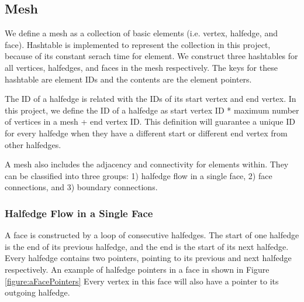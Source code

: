 \documentclass[12pt]{article}
\begin{document}
\subsection{Mesh}
We define a mesh as a collection of basic elements (i.e. vertex, halfedge, and face). Hashtable is implemented to represent the collection in this project, because of its constant serach time for element. We construct three hashtables for all vertices, halfedges, and faces in the mesh respectively. The keys for these hashtable are element IDs and the contents are the element pointers.

The ID of a halfedge is related with the IDs of its start vertex and end vertex. In this project, we define the ID of a halfedge as start vertex ID * maximum number of vertices in a mesh + end vertex ID. This definition will guarantee a unique ID for every halfedge when they have a different start or different end vertex from other halfedges. 

A mesh also includes the adjacency and connectivity for elements within. They can be classified into three groups: 1) halfedge flow in a single face, 2) face connections, and 3) boundary connections.

\subsubsection{Halfedge Flow in a Single Face}
A face is constructed by a loop of consecutive halfedges. The start of one halfedge is the end of its previous halfedge, and the end is the start of its next halfedge. Every halfedge contains two pointers, pointing to its previous and next halfedge respectively. An example of halfedge pointers in a face in shown in Figure \ref{figure:aFacePointers} Every vertex in this face will also have a pointer to its outgoing halfedge.
\end{document}
